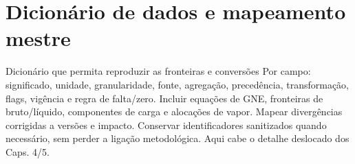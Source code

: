 
\chapter{Dicionário de dados e mapeamento mestre}
\label{app:dicionario}
{Dicionário que permita reproduzir as fronteiras e conversões}
{Por campo: significado, unidade, granularidade, fonte, agregação,
precedência, transformação, flags, vigência e regra de falta/zero.
Incluir equações de GNE, fronteiras de bruto/líquido, componentes de carga
e alocações de vapor. Mapear divergências corrigidas a versões e impacto.
Conservar identificadores sanitizados quando necessário, sem perder
a ligação metodológica. Aqui cabe o detalhe deslocado dos Caps. 4/5.}%


